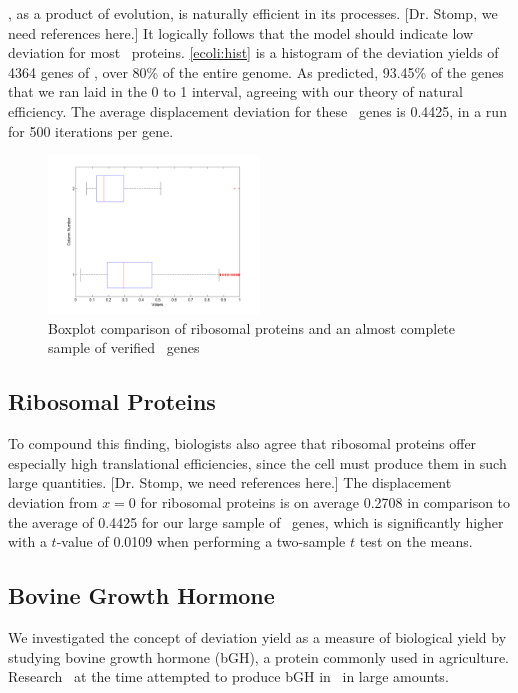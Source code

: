 \documentclass[12pt, draft]{article}
\numberwithin{equation}{section}
\begin{document}
\ecoli, as a product of evolution, is naturally efficient in its
processes. [Dr. Stomp, we need references here.]  It logically follows
that the model should indicate low deviation for most
\ecoli\ proteins.  \autoref{ecoli:hist} is a histogram of the
deviation yields of 4364 genes of \ecoli, over 80\% of the entire
genome.  As predicted, 93.45\% of the genes that we ran laid in the 0
to 1 interval, agreeing with our theory of natural efficiency.  The
average displacement deviation for these \ecoli\ genes is 0.4425, in a
run for 500 iterations per gene.

\begin{figure}
  \caption{Boxplot comparison of ribosomal proteins and an almost
    complete sample of verified \ecoli\ genes}
  \label{ribosomal:comp}
  \includegraphics[width=0.5\textwidth]{histograms/ribosomal}
\end{figure}

\subsection{Ribosomal Proteins}
\label{section:riboproteins}
To compound this finding, biologists also agree that ribosomal
proteins offer especially high translational efficiencies, since the
cell must produce them in such large quantities. [Dr. Stomp, we need
  references here.] The displacement deviation from $x=0$ for ribosomal proteins
is on average 0.2708 in comparison to the average of 0.4425 for our
large sample of \ecoli\ genes, which is significantly higher with a $t$-value of
0.0109 when performing a two-sample $t$ test on the means.

\subsection{Bovine Growth Hormone}
\label{section:bgh}

We investigated the concept of deviation yield as a measure of biological
yield by studying bovine growth hormone (bGH), a protein commonly used
in agriculture.
Research~\cite{schoner:bgh} at the time attempted to produce bGH
in \ecoli\ in large amounts.
\end{document}
